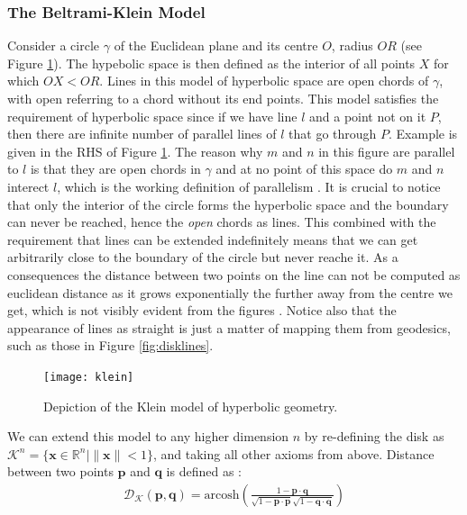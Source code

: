 \documentclass[12pt]{report}
\begin{document}
\subsubsection{The Beltrami-Klein Model}
Consider a circle $\gamma$ of the Euclidean plane and its centre $O$, radius $OR$ (see Figure \ref{fig:klein}). The hypebolic space is then defined as the interior of all points $X$ for which $OX < OR$. Lines in this model of hyperbolic space are open chords of $\gamma$, with open referring to a chord without its end points. This model satisfies the requirement of hyperbolic space since if we have line $l$ and a point not on it $P$, then there are infinite number of parallel lines of $l$ that go through $P$. Example is given in the RHS of Figure \ref{fig:klein}. The reason why $m$ and $n$ in this figure are parallel to $l$ is that they are open chords in $\gamma$ and at no point of this space do $m$ and $n$ interect $l$, which is the working definition of parallelism \cite{Greenberg1994}. It is crucial to notice that only the interior of the circle forms the hyperbolic space and the boundary can never be reached, hence the \textit{open} chords as lines. This combined with the requirement that lines can be extended indefinitely means that we can get arbitrarily close to the boundary of the circle but never reache it. As a consequences the distance between two points on the line can not be computed as euclidean distance as it grows exponentially the further away from the centre we get, which is not visibly evident from the figures \cite{Greenberg1994}. Notice also that the appearance of lines as straight is just a matter of mapping them from geodesics, such as those in Figure \ref{fig:disklines}. 

\begin{figure}
  \centering
	\texttt{[image: klein]}
	\caption{Depiction of the Klein model of hyperbolic geometry.}
	\label{fig:klein}
\end{figure}

We can extend this model to any higher dimension $n$ by re-defining the disk as $\mathcal{K}^n = \{\mathbf{x} \in \mathbb{R}^n | \lVert \mathbf{x} \rVert <1 \}$, and taking all other axioms from above. Distance between two points $\mathbf{p}$ and $\mathbf{q}$ is defined as \cite{Iversen1992}:
\begin{align}
  \mathcal{D_K}(\mathbf{p}, \mathbf{q}) = \text{arcosh} \left( \frac{1 - \mathbf{p} \cdot \mathbf{q}}{\sqrt{1-\mathbf{p}\cdot \mathbf{p}}\sqrt{1-\mathbf{q}\cdot \mathbf{q}}}   \right) 
\end{align}
\end{document}
